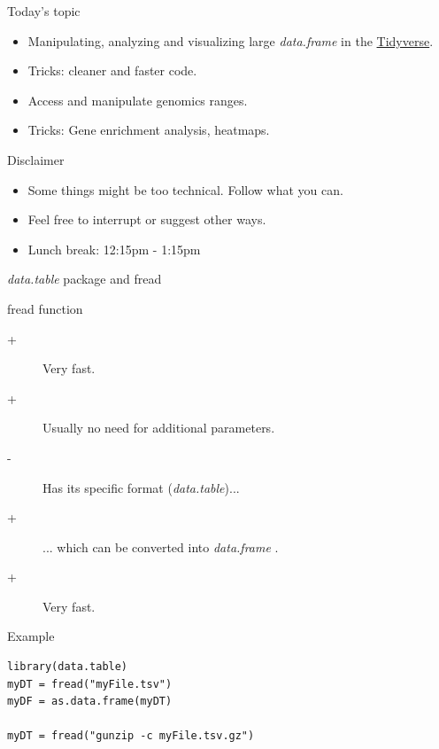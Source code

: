 \documentclass[10pt]{beamer}
\newcommand{\df}{{\it data.frame} }
\begin{document}
\begin{frame}{Today's topic}
  \begin{block}{}
    \begin{itemize}
    \item Manipulating, analyzing and visualizing large \df in the \href{https://www.tidyverse.org/}{Tidyverse}.
    \item Tricks: cleaner and faster code.
      \medskip
      
    \item Access and manipulate genomics ranges.
    \item Tricks: Gene enrichment analysis, heatmaps.
    \end{itemize}
  \end{block}

  \begin{alertblock}{Disclaimer}
    \begin{itemize}
    \item Some things might be too technical. Follow what you can.
    \item Feel free to interrupt or suggest other ways.
    \end{itemize}
  \end{alertblock}

\begin{block}{}
    \begin{itemize}
    \item Lunch break: 12:15pm - 1:15pm
    \end{itemize}
  \end{block}
  
  
\end{frame}


\begin{frame}[fragile]{{\it data.table} package and {\sf fread}}
  \begin{block}{{\sf fread} function}
    \begin{description}
    \item[+] Very fast.
    \item[+] Usually no need for additional parameters.
    \item[-] Has its specific format ({\it data.table})...
    \item[+] ... which can be converted into \df.
    \item[+] Very fast.
    \end{description}
  \end{block}
  \begin{exampleblock}{Example}
    \begin{lstlisting}
library(data.table)
myDT = fread("myFile.tsv")
myDF = as.data.frame(myDT)

myDT = fread("gunzip -c myFile.tsv.gz")
\end{lstlisting}
  \end{exampleblock}
\end{frame}
\end{document}
